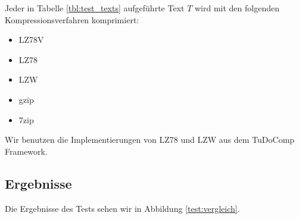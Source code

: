 \documentclass[a4paper,11pt]{scrartcl}%
\theoremstyle{change}
\theoremstyle{nonumberplain}
\theoremstyle{change}
\theoremstyle{nonumberplain}
\theoremstyle{change}
\theoremstyle{nonumberplain}
\begin{document}
Jeder in Tabelle \ref{tbl:test_texts} aufgeführte Text $T$ wird mit den folgenden Kompressionsverfahren komprimiert:

\begin{itemize}
	\item LZ78V
	\item LZ78
	\item LZW
	\item gzip\cite{gzip}
	\item 7zip\cite{7zip}
\end{itemize}

Wir benutzen die Implementierungen von LZ78 und LZW aus dem TuDoComp Framework.

\subsection{Ergebnisse}

Die Ergebnisse des Tests sehen wir in Abbildung \ref{test:vergleich}.
\end{document}
